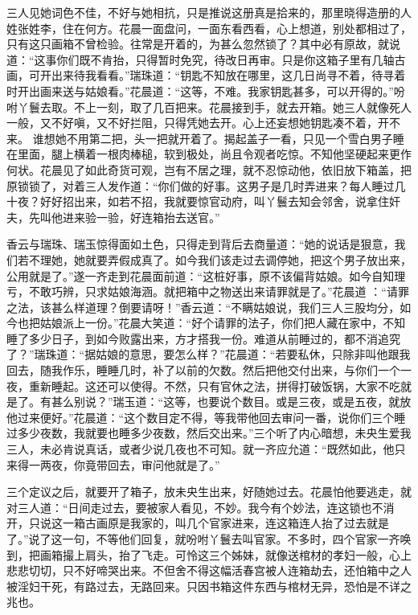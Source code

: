 \documentclass[a4paper,12pt,UTF8,twoside]{ctexbook}
\begin{document}
三人见她词色不佳，不好与她相抗，只是推说这册真是拾来的，那里晓得造册的人姓张姓李，住在何方。花晨一面盘问，一面东看西看，心上想道，别处都相过了，只有这只画箱不曾检验。往常是开着的，为甚么忽然锁了？其中必有原故，就说道：“这事你们既不肯抬，只得暂时免究，待改日再审。只是你这箱子里有几轴古画，可开出来待我看看。”瑞珠道：“钥匙不知放在哪里，这几日尚寻不着，待寻着时开出画来送与姑娘看。”花晨道：“这等，不难。我家钥匙甚多，可以开得的。”吩咐丫鬟去取。不上一刻，取了几百把来。花晨接到手，就去开箱。她三人就像死人一般，又不好嗔，又不好拦阻，只得凭她去开。心上还妄想她钥匙凑不着，开不来。 谁想她不用第二把，头一把就开着了。揭起盖子一看，只见一个雪白男子睡在里面，腿上横着一根肉棒槌，软到极处，尚且令观者吃惊。不知他坚硬起来更作何状。花晨见了如此奇货可观，岂有不居之理，就不忍惊动他，依旧放下箱盖，把原锁锁了，对着三人发作道：“你们做的好事。这男子是几时弄进来？每人睡过几十夜？好好招出来，如若不招，我就要惊官动府，叫丫鬟去知会邻舍，说拿住奸夫，先叫他进来验一验，好连箱抬去送官。”

香云与瑞珠、瑞玉惊得面如土色，只得走到背后去商量道：“她的说话是狠意，我们若不理她，她就要弄假成真了。如今我们该走过去调停她，把这个男子放出来，公用就是了。”遂一齐走到花晨面前道：“这桩好事，原不该偏背姑娘。如今自知理亏，不敢巧辨，只求姑娘海涵。就把箱中之物送出来请罪就是了。”花晨道 ：“请罪之法，该甚么样道理？倒要请呀！”香云道：“不瞒姑娘说，我们三人三股均分，如今也把姑娘派上一份。”花晨大笑道：“好个请罪的法子，你们把人藏在家中，不知睡了多少日子，到如今败露出来，方才搭我一份。难道从前睡过的，都不消追究了？”瑞珠道：“据姑娘的意思，要怎么样？”花晨道：“若要私休，只除非叫他跟我回去，随我作乐，睡睡几时，补了以前的欠数。然后把他交付出来，与你们一个一夜，重新睡起。这还可以使得。不然，只有官休之法，拼得打破饭锅，大家不吃就是了。有甚么别说？”瑞玉道：“这等，也要说个数目。或是三夜，或是五夜，就放他过来便好。”花晨道：“这个数目定不得，等我带他回去审问一番，说你们三个睡过多少夜数，我就要也睡多少夜数，然后交出来。”三个听了内心暗想，未央生爱我三人，未必肯说真话，或者少说几夜也不可知。就一齐应允道：“既然如此，他只来得一两夜，你竟带回去，审问他就是了。”

三个定议之后，就要开了箱子，放未央生出来，好随她过去。花晨怕他要逃走，就对三人道：“日间走过去，要被家人看见，不妙。我今有个妙法，连这锁也不消开，只说这一箱古画原是我家的，叫几个官家进来，连这箱连人抬了过去就是了。”说了这一句，不等他们回复，就吩咐丫鬟去叫官家。不多时，四个官家一齐唤到，把画箱撮上肩头，抬了飞走。可怜这三个姊妹，就像送棺材的孝妇一般，心上悲悲切切，只不好啼哭出来。不但舍不得这幅活春宫被人连箱劫去，还怕箱中之人被淫妇干死，有路过去，无路回来。只因书箱这件东西与棺材无异，恐怕是不详之兆也。
\end{document}
